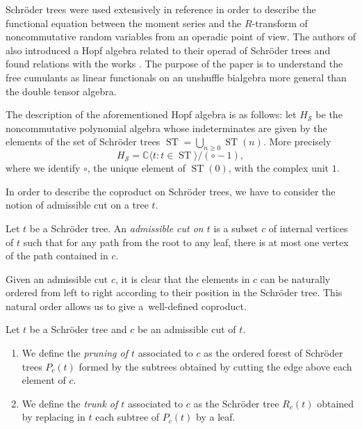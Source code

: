 \documentclass[pdftex]{sigma}%
\numberwithin{equation}{section}
\newcommand{\ST}{\operatorname{ST}}
\newcommand{\cHS}{H_\mathcal{S}}
\begin{document}
Schr\"oder trees were used extensively in reference \cite{JMNT} in order to describe the functional equation between the moment series and the $R$-transform of noncommutative random variables from an operadic point of view. The authors of \cite{JMNT} also introduced a Hopf algebra related to their operad of Schr\"oder trees and found relations with the works \cite{EFP1,EFP3}. The purpose of the paper \cite{JMNT} is to understand the free cumulants as linear functionals on an unshuffle bialgebra more general than the double tensor algebra.

The description of the aforementioned Hopf algebra is as follows: let $\cHS$ be the noncommutative polynomial algebra whose indeterminates are given by the elements of the set of Schr\"oder trees $\ST = \bigcup_{n\geq0} \ST(n)$. More precisely
\[
	\cHS = \mathbb{C}\langle t\colon t\in \ST\rangle/ (\circ -1),
\]
where we identify $\circ$, the unique element of $\ST(0)$, with the complex unit $1$.

In order to describe the coproduct on Schr\"oder trees, we have to consider the notion of {admissible cut} on a tree $t$.

\begin{Definition}
\label{def:admcut}
Let $t$ be a Schr\"oder tree. An \textit{admissible cut on $t$} is a subset $c$ of internal vertices of $t$ such that for any path from the root to any leaf, there is at most one vertex of the path contained in $c$.
\end{Definition}

Given an admissible cut $c$, it is clear that the elements in $c$ can be naturally ordered from left to right according to their position in the Schr\"oder tree. This natural order allows us to give a~well-defined coproduct.

\begin{Definition}\label{def:PrunCuts}
Let $t$ be a Schr\"oder tree and $c$ be an admissible cut of $t$.
\begin{enumerate}\itemsep=0pt
\item[i)] We define the \textit{pruning of $t$} associated to $c$ as the ordered forest of Schr\"oder trees $P_c(t)$ formed by the subtrees obtained by cutting the edge above each element of $c$.
\item[ii)] We define the \textit{trunk of $t$} associated to $c$ as the Schr\"oder tree $R_c(t)$ obtained by replacing in $t$ each subtree of $P_c(t)$ by a leaf.
\end{enumerate}
\end{Definition}
\end{document}
